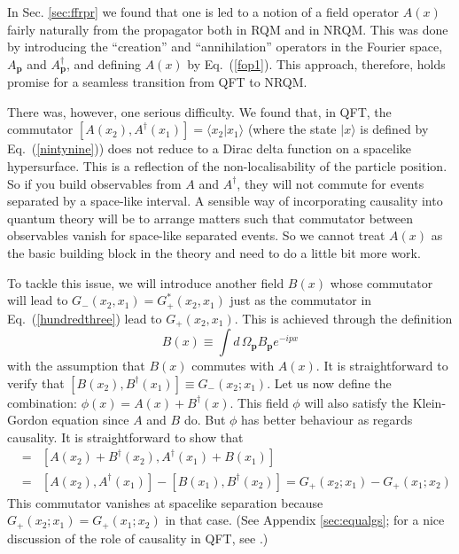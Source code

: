 \documentclass{article}
\def\eq#1{{Eq.~(\ref{#1})}}
\def\ket#1{|#1\rangle}                    %
\def\amp#1#2{\langle #1 | #2\rangle}      %
\begin{document}
In Sec. \ref{sec:ffrpr} we found that one is led to a notion of a field operator $A(x)$ fairly naturally from the propagator both in RQM and in NRQM. This was done by introducing the  
``creation'' and ``annihilation'' operators in the Fourier space, $A_{\bm{p}}$ and $A^\dagger_{\bm{p}}$, and defining $A(x)$ by \eq{fop1}. This approach, therefore, holds promise for a seamless transition from QFT to NRQM. 

There was, however, one serious difficulty.  We found that, in QFT, the commutator $[A(x_2), A^\dagger(x_1)]=\amp{x_2}{x_1}$ (where the state $\ket{x}$ is defined by \eq{nintynine}) does not reduce to a Dirac delta function on a spacelike hypersurface. This is a reflection of the non-localisability of the particle position. 
 So if you build observables from $A$ and $A^\dagger$, they will not commute for events separated by a space-like interval. A sensible way of incorporating causality into quantum theory will be to arrange matters such that commutator between observables vanish for space-like separated events. So we cannot treat $A(x)$ as the basic building block in the theory and  need to do a little bit more work. 

To tackle this issue, we will introduce another field $B(x)$ whose commutator will lead to $G_-(x_2, x_1)=G_+^*(x_2,x_1)$ just as the commutator in \eq{hundredthree} lead to $G_+(x_2,x_1)$. This is achieved through the definition  
\begin{equation}
B(x) \equiv \int d\, \Omega_{\bm{p}} B_{\bm{p}}e^{-ipx}
\end{equation} 
with the assumption that $B(x)$ commutes with $A(x)$. It is straightforward to verify that 
 $
 [B(x_2), B^\dagger(x_1)]  \equiv G_-(x_2;x_1)
$.
  Let us now  define the combination:
$
 \phi(x) = A(x) + B^\dagger(x)
$. This field $\phi$ will also satisfy the Klein-Gordon equation since $A$ and $B$ do. But $\phi$ has better behaviour as regards causality. It is straightforward to show that 
\begin{eqnarray}
[\phi(x_2), \phi^\dagger(x_1)]&=& [A(x_2) + B^\dagger(x_2), A^\dagger(x_1) + B(x_1) ] \\
&=& [ A(x_2), A^\dagger(x_1)] - [B(x_1), B^\dagger(x_2)]
=  G_+(x_2;x_1) - G_+(x_1;x_2)\nonumber 
\end{eqnarray} 
This commutator vanishes at spacelike separation because $G_+(x_2;x_1) = G_+(x_1;x_2)$ in that case. (See Appendix \ref{sec:equalgs}; for a nice discussion of the role of causality in QFT, see \cite{NO}.)
\end{document}
